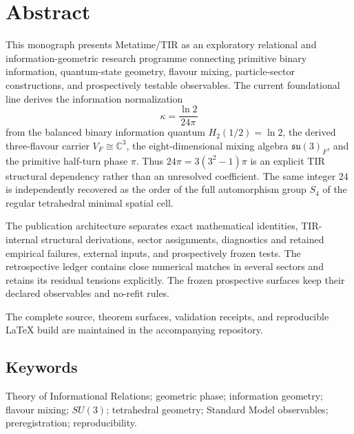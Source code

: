 \chapter*{Abstract}

This monograph presents Metatime/TIR as an exploratory relational and
information-geometric research programme connecting primitive binary information,
quantum-state geometry, flavour mixing, particle-sector constructions, and
prospectively testable observables. The current foundational line derives the
information normalization
\[
\kappa=\frac{\ln2}{24\pi}
\]
from the balanced binary information quantum $H_2(1/2)=\ln2$, the derived
three-flavour carrier $V_F\cong\mathbb C^3$, the eight-dimensional mixing algebra
$\mathfrak{su}(3)_F$, and the primitive half-turn phase $\pi$. Thus
$24\pi=3(3^2-1)\pi$ is an explicit TIR structural dependency rather than an
unresolved coefficient. The same integer $24$ is independently recovered as the
order of the full automorphism group $S_4$ of the regular tetrahedral minimal
spatial cell.

The publication architecture separates exact mathematical identities,
TIR-internal structural derivations, sector assignments, diagnostics and retained
empirical failures, external inputs, and prospectively frozen tests. The
retrospective ledger contains close numerical matches in several sectors and
retains its residual tensions explicitly. The frozen prospective surfaces keep
their declared observables and no-refit rules.

The complete source, theorem surfaces, validation receipts, and reproducible
LaTeX build are maintained in the accompanying repository.

\section*{Keywords}
Theory of Informational Relations; geometric phase; information geometry;
flavour mixing; $SU(3)$; tetrahedral geometry; Standard Model observables;
preregistration; reproducibility.

